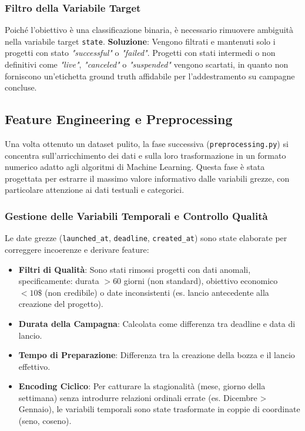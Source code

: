 \documentclass[a4paper,14pt]{extarticle}
\begin{document}
\subsubsection{Filtro della Variabile Target}
Poiché l'obiettivo è una classificazione binaria, è necessario rimuovere ambiguità nella variabile target \texttt{state}.
\textbf{Soluzione}: Vengono filtrati e mantenuti solo i progetti con stato \textit{"successful"} o \textit{"failed"}. Progetti con stati intermedi o non definitivi come \textit{"live"}, \textit{"canceled"} o \textit{"suspended"} vengono scartati, in quanto non forniscono un'etichetta ground truth affidabile per l'addestramento su campagne concluse.


\subsection{Feature Engineering e Preprocessing}
Una volta ottenuto un dataset pulito, la fase successiva (\texttt{preprocessing.py}) si concentra sull'arricchimento dei dati e sulla loro trasformazione in un formato numerico adatto agli algoritmi di Machine Learning. Questa fase è stata progettata per estrarre il massimo valore informativo dalle variabili grezze, con particolare attenzione ai dati testuali e categorici.

\subsubsection{Gestione delle Variabili Temporali e Controllo Qualità}
Le date grezze (\texttt{launched\_at}, \texttt{deadline}, \texttt{created\_at}) sono state elaborate per correggere incoerenze e derivare feature:
\begin{itemize}
    \item \textbf{Filtri di Qualità}: Sono stati rimossi progetti con dati anomali, specificamente: durata $>60$ giorni (non standard), obiettivo economico $<10\$$ (non credibile) o date inconsistenti (es. lancio antecedente alla creazione del progetto).
    \item \textbf{Durata della Campagna}: Calcolata come differenza tra deadline e data di lancio.
    \item \textbf{Tempo di Preparazione}: Differenza tra la creazione della bozza e il lancio effettivo.
    \item \textbf{Encoding Ciclico}: Per catturare la stagionalità (mese, giorno della settimana) senza introdurre relazioni ordinali errate (es. Dicembre > Gennaio), le variabili temporali sono state trasformate in coppie di coordinate (seno, coseno).
\end{itemize}
\end{document}
